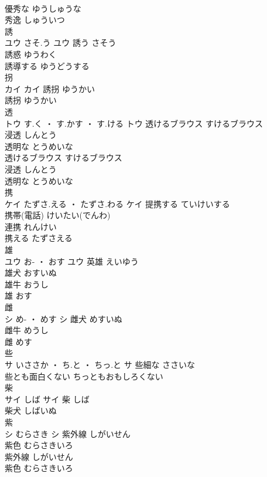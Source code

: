 \documentclass[8pt]{extreport}
\begin{document}
\begin{CJK}{UTF8}{min}
\\	優秀な	ゆうしゅうな	
\\	秀逸	しゅういつ	
\\	誘	
\\	ユウ	さそ.う	ユウ	誘う	さそう	
\\	誘惑	ゆうわく	
\\	誘導する	ゆうどうする	
\\	拐	
\\	カイ		カイ	誘拐	ゆうかい	
\\	誘拐	ゆうかい	
\\	透	
\\	トウ	す.く ・ す.かす ・ す.ける	トウ	透けるブラウス	すけるブラウス	
\\	浸透	しんとう	
\\	透明な	とうめいな	
\\	透けるブラウス	すけるブラウス	
\\	浸透	しんとう	
\\	透明な	とうめいな	
\\	携	
\\	ケイ	たずさ.える ・ たずさ.わる	ケイ	提携する	ていけいする	
\\	携帯(電話)	けいたい(でんわ)	
\\	連携	れんけい	
\\	携える	たずさえる	
\\	雄	
\\	ユウ	お- ・ おす	ユウ	英雄	えいゆう	
\\	雄犬	おすいぬ	
\\	雄牛	おうし	
\\	雄	おす	
\\	雌	
\\	シ	め- ・ めす	シ	雌犬	めすいぬ	
\\	雌牛	めうし	
\\	雌	めす	
\\	些	
\\	サ	いささか ・ ち.と ・ ちっ.と	サ	些細な	ささいな	
\\	些とも面白くない	ちっともおもしろくない	
\\	柴	
\\	サイ	しば	サイ													柴	しば	
\\	柴犬	しばいぬ	
\\	紫	
\\	シ	むらさき	シ	紫外線	しがいせん	
\\	紫色	むらさきいろ	
\\	紫外線	しがいせん	
\\	紫色	むらさきいろ	

\end{CJK}
\end{document}
